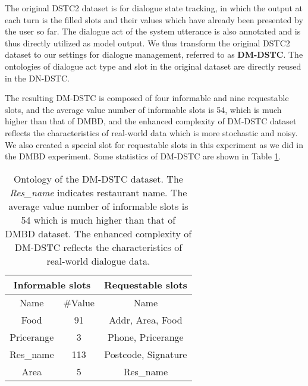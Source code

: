 The original DSTC2 dataset is for dialogue state tracking, in which the output at each turn is the filled slots and their values which have already been presented by the user so far. The dialogue act of the system utterance is also annotated and is thus directly utilized as model output.
We thus transform the original DSTC2 dataset to our settings for dialogue management, referred to as {\bf DM-DSTC}. The ontologies of dialogue act type and slot in the original dataset are directly reused in the DN-DSTC.

The resulting DM-DSTC is composed of four informable and nine requestable slots, and the average value number of informable slots is 54, which is much higher than that of DMBD, and the enhanced complexity of DM-DSTC dataset reflects the characteristics of real-world data which is more stochastic and noisy. We also created a special slot for requestable slots in this experiment as we did in the DMBD experiment. Some statistics of DM-DSTC are shown in Table \ref{tab:dstc-ontology}.


\begin{table}[htbp]
\begin{center}
\begin{tabular}{| c | c | c |}
  \hline
    \multicolumn{2}{|c|}{\bf Informable slots} & \multicolumn{1}{c|}{\bf Requestable slots}\\
  \hline
    Name & \#Value & Name\\
  \hline
    Food & 91 & Addr, Area, Food\\
    Pricerange & 3 & Phone, Pricerange\\
    Res\_name & 113 & Postcode, Signature\\
    Area & 5 & Res\_name\\
  \hline
\end{tabular}
\caption{\label{tab:dstc-ontology}Ontology of the DM-DSTC dataset. The {\em Res\_name} indicates restaurant name. The average value number of informable slots is 54 which is much higher than that of DMBD dataset. The enhanced complexity of DM-DSTC reflects the characteristics of real-world dialogue data.}
\end{center}
\end{table}

